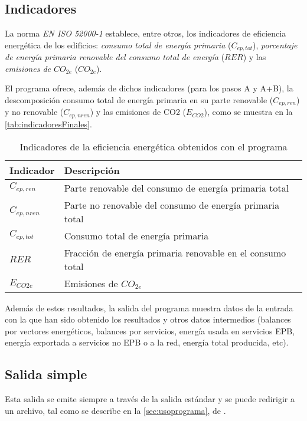 \documentclass[10pt,notitlepage,oneside,a4paper]{article}
\begin{document}
\subsection{Indicadores}

La norma \textit{EN ISO 52000-1} establece, entre otros, los indicadores de eficiencia energética de los edificios: \textit{consumo total de energía primaria} (\texttt{$C_{ep,tot}$}), \textit{porcentaje de energía primaria renovable del consumo total de energía} (\texttt{$RER$}) y las \textit{emisiones de $CO_{2e}$} (\texttt{$CO_{2e}$}).

El programa ofrece, además de dichos indicadores (para los pasos A y A+B), la descomposición consumo total de energía primaria en su parte renovable (\texttt{$C_{ep,ren}$}) y no renovable (\texttt{$C_{ep,nren}$}) y las emisiones de CO2 (\texttt{$E_{CO2}$}), como se muestra en la \autoref{tab:indicadoresFinales}.

\begin{table}[H]
\centering
\small
\caption{Indicadores de la eficiencia energética obtenidos con el programa}\label{tab:indicadoresFinales}
\begin{tabular}{ll}
    \toprule
    \textbf{Indicador} & \textbf{Descripción}\\
    \midrule
    $C_{ep,ren}$ & Parte renovable del consumo de energía primaria total\\
    $C_{ep,nren}$& Parte no renovable del consumo de energía primaria total\\
    $C_{ep,tot}$ & Consumo total de energía primaria\\
    $RER$      & Fracción de energía primaria renovable en el consumo total\\
    $E_{CO2e}$ & Emisiones de $CO_{2e}$\\
    \bottomrule
\end{tabular}
\end{table}

Además de estos resultados, la salida del programa muestra datos de la entrada con la que han sido obtenido los resultados y otros datos intermedios (balances por vectores energéticos, balances por servicios, energía usada en servicios EPB, energía exportada a servicios no EPB o a la red, energía total producida, etc).

\subsection{Salida simple}

Esta salida se emite siempre a través de la salida estándar y se puede redirigir a un archivo, tal como se describe en la \autoref{sec:usoprograma}, de .
\end{document}
